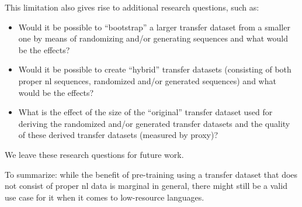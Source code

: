 This limitation also gives rise to additional research questions, such as:
\begin{itemize}
    \item Would it be possible to ``bootstrap'' a larger transfer dataset from a smaller one by means of randomizing and/or generating sequences and what would be the effects?
    \item Would it be possible to create ``hybrid'' transfer datasets (consisting of both proper \gls{nl} sequences, randomized and/or generated sequences) and what would be the effects?
    \item What is the effect of the size of the ``original'' transfer dataset used for deriving the randomized and/or generated transfer datasets and the quality of these derived transfer datasets (measured by proxy)?
\end{itemize}

We leave these research questions for future work.

To summarize: while the benefit of pre-training using a transfer dataset that does not consist of proper \gls{nl} data is marginal in general, there might still be a valid use case for it when it comes to low-resource languages.